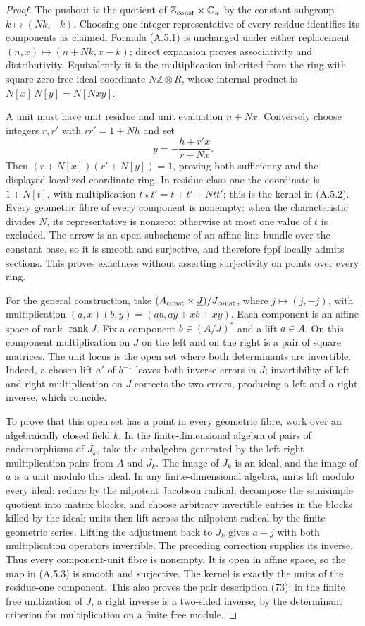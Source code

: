 \begin{proof}
The pushout is the quotient of
$\mathbb Z_{\rm const}\times\mathbb G_a$ by the constant subgroup
$k\mapsto(Nk,-k)$. Choosing one integer representative of every
residue identifies its components as claimed. Formula (A.5.1) is
unchanged under either replacement $(n,x)\mapsto(n+Nk,x-k)$; direct
expansion proves associativity and distributivity. Equivalently it is
the multiplication inherited from the ring with square-zero-free
ideal coordinate $N\mathbb Z\otimes R$, whose internal product is
$N[x]\,N[y]=N[Nxy]$.

A unit must have unit residue and unit evaluation $n+Nx$.
Conversely choose integers $r,r'$ with $rr'=1+Nh$ and set
\[
 y=-\frac{h+r'x}{r+Nx}.
\]
Then $(r+N[x])(r'+N[y])=1$, proving both sufficiency and the displayed
localized coordinate ring. In residue class one the coordinate is
$1+N[t]$, with multiplication $t\star t'=t+t'+Ntt'$; this is the
kernel in (A.5.2). Every geometric fibre of every component is
nonempty: when the characteristic divides $N$, its representative is
nonzero; otherwise at most one value of $t$ is excluded. The arrow is
an open subscheme of an affine-line bundle over the constant base,
so it is smooth and surjective, and therefore fppf locally admits
sections. This proves exactness without asserting surjectivity on
points over every ring.

For the general construction, take
$(A_{\rm const}\times\underline J)/J_{\rm const}$, where
$j\mapsto(j,-j)$, with multiplication
$(a,x)(b,y)=(ab,ay+xb+xy)$. Each component is an affine space of
rank $\operatorname{rank}J$. Fix a component $b\in(A/J)^*$ and a
lift $a\in A$. On this component multiplication on $J$ on the left
and on the right is a pair of square matrices. The unit locus is
the open set where both determinants are invertible. Indeed, a
chosen lift $a'$ of $b^{-1}$ leaves both inverse errors in $J$;
invertibility of left and right multiplication on $J$ corrects the
two errors, producing a left and a right inverse, which coincide.

To prove that this open set has a point in every geometric fibre,
work over an algebraically closed field $k$. In the finite-dimensional
algebra of pairs of endomorphisms of $J_k$, take the subalgebra
generated by the left-right multiplication pairs from $A$ and $J_k$.
The image of $J_k$ is an ideal, and the image of $a$ is a unit modulo
this ideal. In any finite-dimensional algebra, units lift modulo every
ideal: reduce by the nilpotent Jacobson radical, decompose the
semisimple quotient into matrix blocks, and choose arbitrary invertible
entries in the blocks killed by the ideal; units then lift across the
nilpotent radical by the finite geometric series. Lifting the
adjustment back to $J_k$ gives $a+j$ with both multiplication
operators invertible. The preceding correction supplies its inverse.
Thus every component-unit fibre is nonempty. It is open in affine
space, so the map in (A.5.3) is smooth and surjective. The kernel is
exactly the units of the residue-one component. This also proves the
pair description (73): in the finite free unitization of $J$, a right
inverse is a two-sided inverse, by the determinant criterion for
multiplication on a finite free module.
\end{proof}


